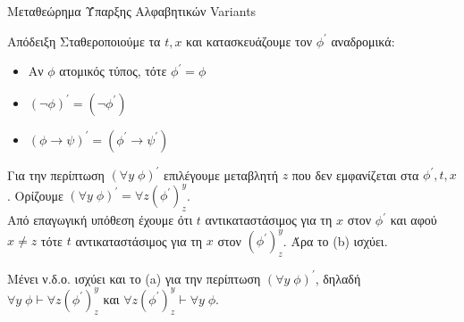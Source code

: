\documentclass{beamer}
\begin{document}
\begin{frame}{Μεταθεώρημα Ύπαρξης Αλφαβητικών Variants}
  \begin{block}{Απόδειξη}
    Σταθεροποιούμε τα $t,x$ και κατασκευάζουμε τον $\phi^\prime$ αναδρομικά:
    \begin{itemize}
      \item Αν $\phi$ ατομικός τύπος, τότε $\phi^\prime = \phi$
      \item $(\neg\phi)^\prime = (\neg\phi^\prime)$
      \item $(\phi \rightarrow \psi)^\prime = (\phi^\prime \rightarrow \psi^\prime)$
    \end{itemize}
    Για την περίπτωση $(\forall y \; \phi)^\prime$ επιλέγουμε μεταβλητή $z$ που δεν εμφανίζεται στα $\phi^\prime, t, x$. Ορίζουμε $(\forall y \; \phi)^\prime = \forall z (\phi^\prime)_z^y$.\\
    Από επαγωγική υπόθεση έχουμε ότι $t$ αντικαταστάσιμος για τη $x$ στον $\phi^\prime$ και αφού $x \neq z$ τότε $t$ αντικαταστάσιμος για τη $x$ στον $(\phi^\prime)_z^y$. Άρα το (b) ισχύει.
  \end{block}
  \begin{block}{}
    Μένει ν.δ.ο. ισχύει και το (a) για την περίπτωση $(\forall y \; \phi)^\prime$, δηλαδή\\
    $\forall y \; \phi \vdash \forall z (\phi^\prime)_z^y$ και $\forall z (\phi^\prime)_z^y \vdash \forall y \; \phi$.
  \end{block}
\end{frame}
\end{document}
